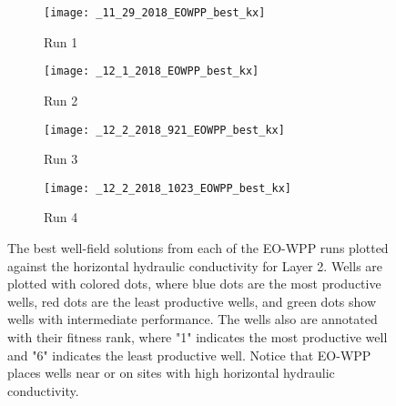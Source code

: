 \documentclass[authoryear]{elsarticle}
\begin{document}
\begin{figure}
\centering
\begin{subfigure}{.5\textwidth}
    \centering
    \texttt{[image: \_11\_29\_2018\_EOWPP\_best\_kx]}
    \caption{Run 1}
    \label{fig:sfig1}
\end{subfigure}%
\begin{subfigure}{.5\textwidth}
    \centering
    \texttt{[image: \_12\_1\_2018\_EOWPP\_best\_kx]}
    \caption{Run 2}
    \label{fig:sfig2}
\end{subfigure}
\begin{subfigure}{.5\textwidth}
    \centering
    \texttt{[image: \_12\_2\_2018\_921\_EOWPP\_best\_kx]}
    \caption{Run 3}
    \label{fig:sfig3}
\end{subfigure}%
\begin{subfigure}{.5\textwidth}
    \centering
    \texttt{[image: \_12\_2\_2018\_1023\_EOWPP\_best\_kx]}
    \caption{Run 4}
    \label{fig:sfig4}
\end{subfigure}
\caption{The best well-field solutions from each of the EO-WPP runs plotted against the horizontal hydraulic conductivity for Layer 2. Wells are plotted with colored dots, where blue dots are the most productive wells, red dots are the least productive wells, and green dots show wells with intermediate performance. The wells also are annotated with their fitness rank, where "1" indicates the most productive well and "6" indicates the least productive well. Notice that EO-WPP places wells near or on sites with high horizontal hydraulic conductivity.}
\label{fig:Case3Solutions}
\end{figure}
\end{document}
